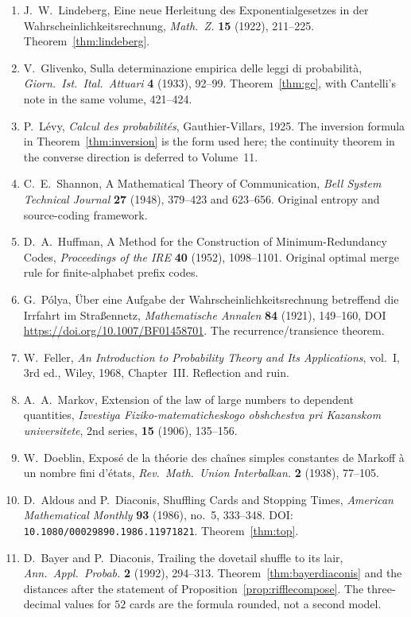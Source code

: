\begin{enumerate}
\item J.~W.~Lindeberg, Eine neue Herleitung des Exponentialgesetzes in der Wahrscheinlichkeitsrechnung, \emph{Math.\ Z.} \textbf{15} (1922), 211--225. Theorem~\ref{thm:lindeberg}.
\item V.~Glivenko, Sulla determinazione empirica delle leggi di probabilit\`a, \emph{Giorn.\ Ist.\ Ital.\ Attuari} \textbf{4} (1933), 92--99. Theorem~\ref{thm:gc}, with Cantelli's note in the same volume, 421--424.
\item P.~L\'evy, \emph{Calcul des probabilit\'es}, Gauthier-Villars, 1925. The inversion formula in Theorem~\ref{thm:inversion} is the form used here; the continuity theorem in the converse direction is deferred to Volume~11.
\item C.~E.~Shannon, A Mathematical Theory of Communication, \emph{Bell System Technical Journal} \textbf{27} (1948), 379--423 and 623--656. Original entropy and source-coding framework.
\item D.~A.~Huffman, A Method for the Construction of Minimum-Redundancy Codes, \emph{Proceedings of the IRE} \textbf{40} (1952), 1098--1101. Original optimal merge rule for finite-alphabet prefix codes.
\item G.~P\'olya, \"Uber eine Aufgabe der Wahrscheinlichkeitsrechnung betreffend die Irrfahrt im Stra\ss ennetz, \emph{Mathematische Annalen} \textbf{84} (1921), 149--160, DOI \url{https://doi.org/10.1007/BF01458701}. The recurrence/transience theorem.
\item W.~Feller, \emph{An Introduction to Probability Theory and Its Applications}, vol.~I, 3rd ed., Wiley, 1968, Chapter~III. Reflection and ruin.
\item A.~A.~Markov, Extension of the law of large numbers to dependent quantities, \emph{Izvestiya Fiziko-matematicheskogo obshchestva pri Kazanskom universitete}, 2nd series, \textbf{15} (1906), 135--156.
\item W.~Doeblin, Expos\'e de la th\'eorie des cha\^ines simples constantes de Markoff \`a un nombre fini d'\'etats, \emph{Rev.\ Math.\ Union Interbalkan.} \textbf{2} (1938), 77--105.
\item D.~Aldous and P.~Diaconis, Shuffling Cards and Stopping Times, \emph{American Mathematical Monthly} \textbf{93} (1986), no.~5, 333--348. DOI: \texttt{10.1080/00029890.1986.11971821}. Theorem~\ref{thm:top}.
\item D.~Bayer and P.~Diaconis, Trailing the dovetail shuffle to its lair, \emph{Ann.\ Appl.\ Probab.} \textbf{2} (1992), 294--313. Theorem~\ref{thm:bayerdiaconis} and the distances after the statement of Proposition~\ref{prop:rifflecompose}. The three-decimal values for $52$ cards are the formula rounded, not a second model.

\end{enumerate}
